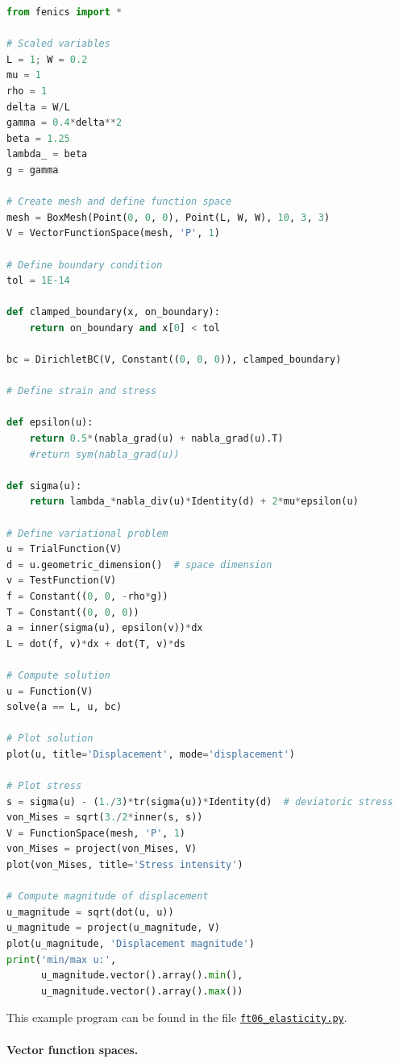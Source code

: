 \documentclass[graybox,envcountchap,sectrefs,final]{svmonodo}
\begin{document}
\begin{lstlisting}[language=Python,style=graycolor]
from fenics import *

# Scaled variables
L = 1; W = 0.2
mu = 1
rho = 1
delta = W/L
gamma = 0.4*delta**2
beta = 1.25
lambda_ = beta
g = gamma

# Create mesh and define function space
mesh = BoxMesh(Point(0, 0, 0), Point(L, W, W), 10, 3, 3)
V = VectorFunctionSpace(mesh, 'P', 1)

# Define boundary condition
tol = 1E-14

def clamped_boundary(x, on_boundary):
    return on_boundary and x[0] < tol

bc = DirichletBC(V, Constant((0, 0, 0)), clamped_boundary)

# Define strain and stress

def epsilon(u):
    return 0.5*(nabla_grad(u) + nabla_grad(u).T)
    #return sym(nabla_grad(u))

def sigma(u):
    return lambda_*nabla_div(u)*Identity(d) + 2*mu*epsilon(u)

# Define variational problem
u = TrialFunction(V)
d = u.geometric_dimension()  # space dimension
v = TestFunction(V)
f = Constant((0, 0, -rho*g))
T = Constant((0, 0, 0))
a = inner(sigma(u), epsilon(v))*dx
L = dot(f, v)*dx + dot(T, v)*ds

# Compute solution
u = Function(V)
solve(a == L, u, bc)

# Plot solution
plot(u, title='Displacement', mode='displacement')

# Plot stress
s = sigma(u) - (1./3)*tr(sigma(u))*Identity(d)  # deviatoric stress
von_Mises = sqrt(3./2*inner(s, s))
V = FunctionSpace(mesh, 'P', 1)
von_Mises = project(von_Mises, V)
plot(von_Mises, title='Stress intensity')

# Compute magnitude of displacement
u_magnitude = sqrt(dot(u, u))
u_magnitude = project(u_magnitude, V)
plot(u_magnitude, 'Displacement magnitude')
print('min/max u:',
      u_magnitude.vector().array().min(),
      u_magnitude.vector().array().max())
\end{lstlisting}
This example program can be found in the file \href{{https://fenicsproject.org/pub/tutorial/python/vol1/ft06_elasticity.py}}{\nolinkurl{ft06_elasticity.py}}.


\paragraph{Vector function spaces.}
\end{document}
